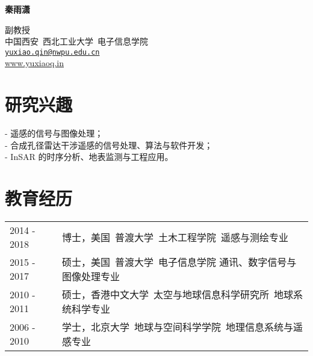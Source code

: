 \documentclass[letterpaper]{article}
\def\name{\textbf{秦雨潇}}
\begin{document}
{\huge \name}


\vspace{0.2in}

\begin{minipage}{0.8\linewidth}
	副教授 \\
	中国西安\ 西北工业大学\ 电子信息学院\\
  \href{mailto:yuxiao.qin@nwpu.edu.cn}{\tt yuxiao.qin@nwpu.edu.cn} \\ 
  \href{www.yuxiaoq.in}{www.yuxiaoq.in}
\end{minipage}


\section*{\textsc{研究兴趣}}
- 遥感的信号与图像处理；\vspace{.5em}\\
- 合成孔径雷达干涉遥感的信号处理、算法与软件开发；\vspace{.5em}\\
- InSAR 的时序分析、地表监测与工程应用。


\section*{\textsc{教育经历}}
\begin{tabular}{ll}
2014 - 2018 & 博士，美国\ 普渡大学\ 土木工程学院\ 遥感与测绘专业\vspace{.5em}\\
2015 - 2017 & 硕士，美国\ 普渡大学\ 电子信息学院 通讯、数字信号与图像处理专业\vspace{.5em}\\
2010 - 2011 & 硕士，香港中文大学\ 太空与地球信息科学研究所\  地球系统科学专业 \vspace{.5em}\\
2006 - 2010 & 学士，北京大学\ 地球与空间科学学院\ 地理信息系统与遥感专业
\end{tabular}
\end{document}
